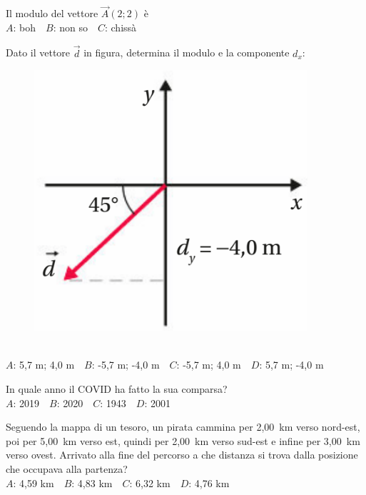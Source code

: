 \mcquestionfooter



\def\mcquestionnumber{3}


\mcquestionheader Il modulo del vettore $\vec{A}(2;2)$ è\\
{$A$}: boh\ \ {$B$}: non so\ \ {$C$}: chissà\ \ 

\mcquestionfooter



\def\mcquestionnumber{4}


\mcquestionheader Dato il vettore $\vec{d}$ in figura, determina il modulo e la componente $d_x$: \begin{figure}[h!]   \begin{center}     \includegraphics[scale=0.35]{vettored.png}   \end{center} \end{figure}\\
{$A$}: 5,7 m; 4,0 m\ \ {$B$}: -5,7 m; -4,0 m\ \ {$C$}: -5,7 m; 4,0 m\ \ {$D$}: 5,7 m; -4,0 m\ \ 

\mcquestionfooter



\def\mcquestionnumber{5}


\mcquestionheader In quale anno il COVID ha fatto la sua comparsa?\\
{$A$}: 2019\ \ {$B$}: 2020\ \ {$C$}: 1943\ \ {$D$}: 2001\ \ 

\mcquestionfooter



\def\mcquestionnumber{6}


\mcquestionheader Seguendo la mappa di un tesoro, un pirata cammina per 2,00~km verso nord-est, poi per 5,00~km verso est, quindi per 2,00~km verso sud-est e infine per 3,00~km verso ovest. Arrivato alla fine del percorso a che distanza si trova dalla posizione che occupava alla partenza?\\
{$A$}: 4,59 km\ \ {$B$}: 4,83 km\ \ {$C$}: 6,32 km\ \ {$D$}: 4,76 km\ \ 

